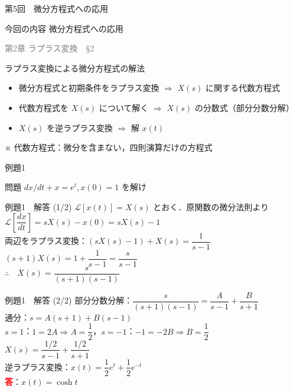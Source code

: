 \documentclass[professionalfonts]{beamer}
\begin{document}
\begin{frame}{第5回　微分方程式への応用}
  \begin{block}{今回の内容}
  微分方程式への応用
  \end{block}
  \vfill\hfill{\scriptsize \textcolor{gray}{第2章 ラプラス変換　§2}}
\end{frame}

\begin{frame}{ラプラス変換による微分方程式の解法}
  \begin{block}{}
  \begin{itemize}
    \item 微分方程式と初期条件をラプラス変換
    $\Rightarrow$ $X(s)$ に関する代数方程式
    \item 代数方程式を $X(s)$ について解く
    $\Rightarrow$ $X(s)$ の分数式（部分分数分解）
    \item $X(s)$ を逆ラプラス変換
    $\Rightarrow$ 解 $x(t)$
  \end{itemize}
  \vspace{4pt}
  {\small ※ 代数方程式：微分を含まない，四則演算だけの方程式}
  \end{block}
\end{frame}

\begin{frame}{例題1}
  \begin{exampleblock}{問題}
    $dx/dt + x = e^t, x(0) = 1$ を解け\\[2pt]
  \end{exampleblock}
\end{frame}

\begin{frame}{例題1　解答 (1/2)}
  $\mathcal{L}[x(t)] = X(s)$ とおく．原関数の微分法則より\\[4pt]
  $\mathcal{L}\!\left[\dfrac{dx}{dt}\right] = sX(s) - x(0) = sX(s) - 1$\\[4pt]
  両辺をラプラス変換：$(sX(s) - 1) + X(s) = \dfrac{1}{s-1}$\\[4pt]
  $(s+1)X(s) = 1 + \dfrac{1}{s-1} = \dfrac{s}{s-1}$\\[6pt]
  $\therefore\quad X(s) = \dfrac{s}{(s+1)(s-1)}$
\end{frame}

\begin{frame}{例題1　解答 (2/2)}
  部分分数分解：$\dfrac{s}{(s+1)(s-1)} = \dfrac{A}{s-1}+\dfrac{B}{s+1}$\\[4pt]
  通分：$s = A(s+1) + B(s-1)$\\[4pt]
  $s=1$：$1=2A \Rightarrow A=\dfrac{1}{2}$，\quad $s=-1$：$-1=-2B \Rightarrow B=\dfrac{1}{2}$\\[4pt]
  $X(s) = \dfrac{1/2}{s-1} + \dfrac{1/2}{s+1}$\\[4pt]
  逆ラプラス変換：$x(t) = \dfrac{1}{2}e^t + \dfrac{1}{2}e^{-t}$
  \\[8pt]\textcolor{red}{\textbf{答}}：$x(t) = \cosh t$
\end{frame}
\end{document}
